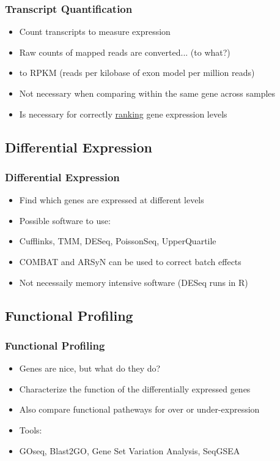 \documentclass[14pt]{beamer}
\begin{document}
\begin{frame}
\frametitle{Transcript Quantification}
\begin{itemize}
	\item<1-> Count transcripts to measure expression
	\item<2-> Raw counts of mapped reads are converted... (to what?)
	\item<3-> to RPKM (reads per kilobase of exon model per million reads)
	\item<4-> Not necessary when comparing within the same gene across samples
	\item<5-> Is necessary for correctly \underline{ranking} gene expression levels
\end{itemize}
\end{frame}

\subsection{Differential Expression}

\begin{frame}
\frametitle{Differential Expression}
\begin{itemize}
	\item<1-> Find which genes are expressed at different levels
	\item<2-> Possible software to use:
	\item<3-> Cufflinks, TMM, DESeq, PoissonSeq, UpperQuartile
	\item<4-> COMBAT and ARSyN can be used to correct batch effects
	\item<5-> Not necessaily memory intensive software (DESeq runs in R)
\end{itemize}
\end{frame}

\subsection{Functional Profiling}

\begin{frame}
\frametitle{Functional Profiling}
\begin{itemize}
	\item<1-> Genes are nice, but what do they do?
	\item<2-> Characterize the function of the differentially expressed genes
	\item<3-> Also compare functional patheways for over or under-expression
	\item<4-> Tools:
	\item<5-> GOseq, Blast2GO, Gene Set Variation Analysis, SeqGSEA
\end{itemize}
\end{frame}
\end{document}
